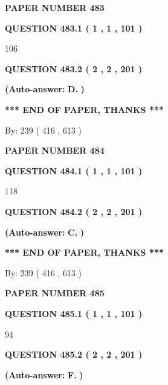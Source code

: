 \documentclass{ctexart}
\begin{document}
   
 {\textbf{ \Large{ PAPER NUMBER  483  }}}
   
   
   
   
  
  
{\textbf{\large{QUESTION
483.1 
 ( 1 , 1 , 101 )
}}}

106
  
  
{\textbf{\large{QUESTION
483.2 
 ( 2 , 2 , 201 )
}}}
 
 
{\textbf{(Auto-answer:}}
{\textbf{\large{
D.}}}
{\textbf{)}}
 
 
   
   
   
   
\vspace{1.0in} 
{\textbf{\large{ *** END OF PAPER, THANKS *** }}} 
   
   
\hspace{1.0in} By: 
 239 ( 416 ,  613 )
   
   
   
   
\newpage 
\setcounter{page}{ 
   484001 } 
   
   
 {\textbf{ \Large{ PAPER NUMBER  484  }}}
   
   
   
   
  
  
{\textbf{\large{QUESTION
484.1 
 ( 1 , 1 , 101 )
}}}

118
  
  
{\textbf{\large{QUESTION
484.2 
 ( 2 , 2 , 201 )
}}}
 
 
{\textbf{(Auto-answer:}}
{\textbf{\large{
C.}}}
{\textbf{)}}
 
 
   
   
   
   
\vspace{1.0in} 
{\textbf{\large{ *** END OF PAPER, THANKS *** }}} 
   
   
\hspace{1.0in} By: 
 239 ( 416 ,  613 )
   
   
   
   
\newpage 
\setcounter{page}{ 
   485001 } 
   
   
 {\textbf{ \Large{ PAPER NUMBER  485  }}}
   
   
   
   
  
  
{\textbf{\large{QUESTION
485.1 
 ( 1 , 1 , 101 )
}}}

94
  
  
{\textbf{\large{QUESTION
485.2 
 ( 2 , 2 , 201 )
}}}
 
 
{\textbf{(Auto-answer:}}
{\textbf{\large{
F.}}}
{\textbf{)}}
 
\end{document}
